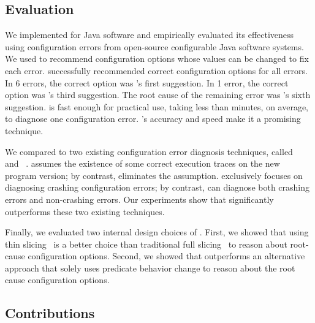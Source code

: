 \subsection{Evaluation}

We implemented \ourtool for Java software and empirically evaluated
its effectiveness using \errornum configuration errors
from \subjnum open-source configurable Java software systems. 
We used \ourtool to recommend configuration options whose values
can be changed to fix each error.
\ourtool successfully recommended correct configuration options
for all \errornum errors. In 6 errors, the correct option was \ourtool's first
suggestion. In 1 error, the correct option was
\ourtool's third suggestion. The root cause of the remaining
error was \ourtool's sixth suggestion. \ourtool is fast enough for practical use,
taking less than \avgtime minutes,
on average, to diagnose one configuration error.
\ourtool's accuracy and speed make it a promising technique.


We compared \ourtool to two existing configuration error diagnosis
techniques, called \prevtool~\cite{Zhang:2013:ADS}
and \conftool~\cite{Rabkin:2011:PPC}.
\prevtool assumes the existence of some correct execution traces
on the new program version; by contrast, \ourtool eliminates the
assumption.
\conftool exclusively focuses on diagnosing crashing configuration errors;
by contrast, \ourtool can diagnose both crashing errors and
non-crashing errors.
Our experiments
show that \ourtool significantly outperforms these two existing techniques.

Finally, we evaluated two internal design choices of \ourtool. First, we 
showed that using thin slicing~\cite{Sridharan:2007} is a better choice than
traditional full slicing~\cite{Horwitz:1988} to reason about 
root-cause configuration options. Second, we showed that 
\ourtool outperforms an alternative approach
that solely uses predicate behavior change to reason about
the root cause configuration options.




\subsection{Contributions}

